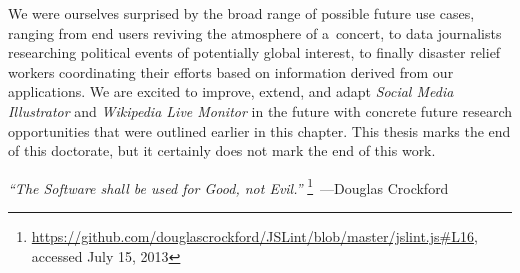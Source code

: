 We were ourselves surprised by the broad range
of possible future use cases, ranging from end users
reviving the atmosphere of a~concert,
to data journalists researching political events
of potentially global interest,
to finally disaster relief workers coordinating
their efforts based on information derived from our applications.
We are excited to improve, extend, and adapt
\emph{Social Media Illustrator} and \emph{Wikipedia Live Monitor}
in the future with concrete future research opportunities
that were outlined earlier in this chapter.
This thesis marks the end of this doctorate,
but it certainly does not mark the end of this work.

\begin{flushright}
\textit{``The Software shall be used for Good, not Evil.''}%
\footnote{\url{https://github.com/douglascrockford/JSLint/blob/master/jslint.js\#L16},
accessed July 15, 2013}~---Douglas Crockford
\end{flushright}

\clearpage
\printbibliography[heading=subbibliography]